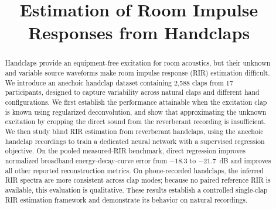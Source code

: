 \documentclass{article}
\begin{document}
\ninept

\title{Estimation of Room Impulse Responses from Handclaps}



\address{
$^1$ National Taiwan University, Taipei, Taiwan \,
$^2$ Acoustics Lab, DICE, Aalto University, Espoo, Finland\\
$^3$ MoonShine Animation Studio, Taipei, Taiwan}

\maketitle
\begin{abstract}
Handclaps provide an equipment-free excitation for room acoustics, but their unknown and variable source waveforms make room impulse response (RIR) estimation difficult.
We introduce an anechoic handclap dataset containing 2,588 claps from
17 participants, designed to capture variability across natural claps and
different hand configurations.
We first establish the performance attainable when the excitation clap is known using regularized deconvolution, and show that approximating the unknown excitation by cropping the direct sound from the reverberant recording is insufficient.
We then study blind RIR estimation from reverberant handclaps, using the
anechoic handclap recordings to train a dedicated neural network with a
supervised regression objective. On the pooled measured-RIR benchmark, direct
regression improves normalized broadband energy-decay-curve error from
$-18.3$ to $-21.7$~dB and improves all other reported reconstruction metrics.
On phone-recorded handclaps, the inferred RIR spectra are more consistent across clap modes; because no paired reference RIR is available, this evaluation is qualitative.
These results establish a controlled single-clap RIR estimation framework and demonstrate its behavior on natural recordings.
\end{abstract}
\end{document}
